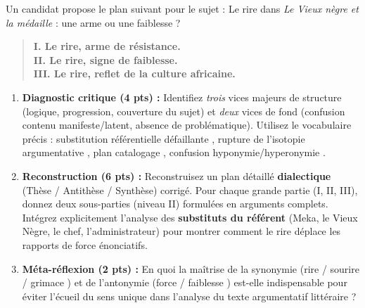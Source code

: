 \documentclass[11pt]{article}
\begin{document}
\begin{exercice}
Un candidat propose le plan suivant pour le sujet : \og Le rire dans \textit{Le Vieux nègre et la médaille} : une arme ou une faiblesse ? \fg
\begin{quote}
    \textbf{I. Le rire, arme de résistance.} \\
    \textbf{II. Le rire, signe de faiblesse.} \\
    \textbf{III. Le rire, reflet de la culture africaine.}
\end{quote}

\begin{enumerate}
    \item \textbf{Diagnostic critique (4 pts) :} Identifiez \textit{trois} vices majeurs de structure (logique, progression, couverture du sujet) et \textit{deux} vices de fond (confusion contenu manifeste/latent, absence de problématique). Utilisez le vocabulaire précis : \og substitution référentielle défaillante \fg, \og rupture de l'isotopie argumentative \fg, \og plan catalogage \fg, \og confusion hyponymie/hyperonymie \fg.
    \item \textbf{Reconstruction (6 pts) :} Reconstruisez un plan détaillé \textbf{dialectique} (Thèse / Antithèse / Synthèse) corrigé. Pour chaque grande partie (I, II, III), donnez deux sous-parties (niveau II) formulées en arguments complets. Intégrez explicitement l'analyse des \textbf{substituts du référent} (Meka, le Vieux Nègre, le chef, l'administrateur) pour montrer comment le rire déplace les rapports de force énonciatifs.
    \item \textbf{Méta-réflexion (2 pts) :} En quoi la maîtrise de la synonymie (\og rire \fg / \og sourire \fg / \og grimace \fg) et de l'antonymie (\og force \fg / \og faiblesse \fg) est-elle indispensable pour éviter l'écueil du \og sens unique \fg dans l'analyse du texte argumentatif littéraire ?
\end{enumerate}
\end{exercice}
\end{document}
